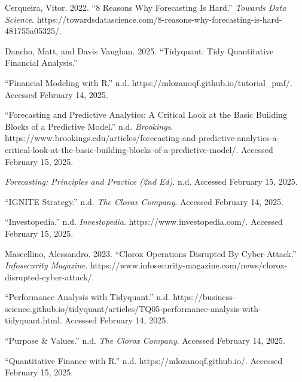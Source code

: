 \documentclass[
  letterpaper,
  DIV=11,
  numbers=noendperiod]{scrartcl}
\newlength{\cslhangindent}
\newenvironment{CSLReferences}[2] %
 {\begin{list}{}{%
  \setlength{\itemindent}{0pt}
  \setlength{\leftmargin}{0pt}
  \setlength{\parsep}{0pt}
  \ifodd #1
   \setlength{\leftmargin}{\cslhangindent}
   \setlength{\itemindent}{-1\cslhangindent}
  \fi
  \setlength{\itemsep}{#2\baselineskip}}}
 {\end{list}}
\begin{document}
\label{refs}
\begin{CSLReferences}{1}{0}
Cerqueira, Vitor. 2022. {``8 {Reasons Why Forecasting Is Hard}.''}
\emph{Towards Data Science}.
https://towardsdatascience.com/8-reasons-why-forecasting-is-hard-481755a05325/.

Dancho, Matt, and Davis Vaughan. 2025. {``Tidyquant: {Tidy Quantitative
Financial Analysis}.''}

{``Financial Modeling with {R}.''} n.d.
https://mlozanoqf.github.io/tutorial\_pmf/. Accessed February 14, 2025.

{``Forecasting and Predictive Analytics: {A} Critical Look at the Basic
Building Blocks of a Predictive Model.''} n.d. \emph{Brookings}.
https://www.brookings.edu/articles/forecasting-and-predictive-analytics-a-critical-look-at-the-basic-building-blocks-of-a-predictive-model/.
Accessed February 15, 2025.

\emph{Forecasting: {Principles} and {Practice} (2nd Ed)}. n.d. Accessed
February 15, 2025.

{``{IGNITE Strategy}.''} n.d. \emph{The Clorox Company}. Accessed
February 14, 2025.

{``Investopedia.''} n.d. \emph{Investopedia}.
https://www.investopedia.com/. Accessed February 15, 2025.

Mascellino, Alessandro. 2023. {``Clorox {Operations Disrupted By
Cyber-Attack}.''} \emph{Infosecurity Magazine}.
https://www.infosecurity-magazine.com/news/clorox-disrupted-cyber-attack/.

{``Performance {Analysis} with Tidyquant.''} n.d.
https://business-science.github.io/tidyquant/articles/TQ05-performance-analysis-with-tidyquant.html.
Accessed February 14, 2025.

{``Purpose \& {Values}.''} n.d. \emph{The Clorox Company}. Accessed
February 14, 2025.

{``Quantitative Finance with {R}.''} n.d. https://mlozanoqf.github.io/.
Accessed February 15, 2025.


\end{CSLReferences}
\end{document}
